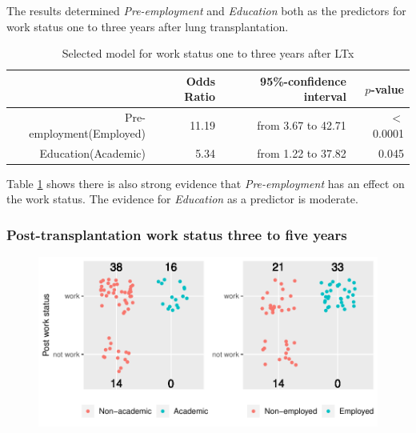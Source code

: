 \documentclass[11pt, a4paper]{article}\usepackage[]{graphicx}\usepackage[]{color}
\makeatletter
\def\maxwidth{ %
  \ifdim\Gin@nat@width>\linewidth
    \linewidth
  \else
    \Gin@nat@width
  \fi
}
\newenvironment{knitrout}{}{} %
\makeatother
\begin{document}
{%
\begin{table}[ht]
\centering
\caption{Model selection for work status one to three years after LTx} 
\end{table}



The results determined \textit{Pre-employment} and \textit{Education} both as the predictors for work status one to three years after lung transplantation.

\begin{table}[!h]
\centering
\caption{Selected model for work status one to three years after LTx} 
\label{tab:tab9}
\begingroup\footnotesize
\begin{tabular}{rrrr}
  \hline
 & Odds Ratio & 95\%-confidence interval & $p$-value \\ 
  \hline
Pre-employment(Employed) & 11.19 & from 3.67 to 42.71 & $<$ 0.0001 \\ 
  Education(Academic) & 5.34 & from 1.22 to 37.82 & 0.045 \\ 
   \hline
\end{tabular}
\endgroup
\end{table}


Table \ref{tab:tab9} shows there is also strong evidence that \textit{Pre-employment} has an effect on the work status. The evidence for \textit{Education} as a predictor is moderate.  

\clearpage
\subsubsection*{Post-transplantation work status three to five years} \label{subsubsec:logis3}

\begin{figure}[ht]
\begin{knitrout}
\color{fgcolor}
\includegraphics[width=\maxwidth]{plots/ptwoby2plot-1} 


\end{knitrout}
\end{figure}}
\end{document}
